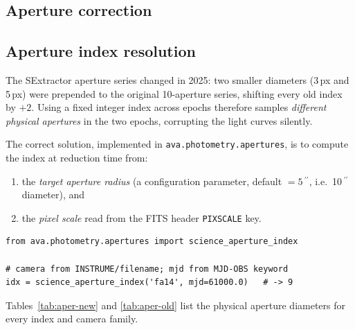 \documentclass[12pt,a4paper]{article}
\begin{document}
\subsection{Aperture correction}


\subsection{Aperture index resolution}
\label{sec:aper-index}

The SExtractor aperture series changed in 2025: two smaller diameters (3\,px
and 5\,px) were prepended to the original 10-aperture series, shifting every
old index by $+2$.  Using a fixed integer index across epochs therefore
samples \emph{different physical apertures} in the two epochs, corrupting the
light curves silently.

The correct solution, implemented in \texttt{ava.photometry.apertures}, is to
compute the index at reduction time from:
\begin{enumerate}
  \item the \emph{target aperture radius} (a configuration parameter,
        default $= 5$\,\ensuremath{^{\prime\prime}}, i.e.\ 10\,\ensuremath{^{\prime\prime}} diameter), and
  \item the \emph{pixel scale} read from the FITS header \texttt{PIXSCALE} key.
\end{enumerate}

\begin{lstlisting}[style=python]
from ava.photometry.apertures import science_aperture_index

# camera from INSTRUME/filename; mjd from MJD-OBS keyword
idx = science_aperture_index('fa14', mjd=61000.0)   # -> 9
\end{lstlisting}

Tables~\ref{tab:aper-new} and \ref{tab:aper-old} list the physical aperture
diameters for every index and camera family.
\end{document}

